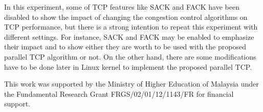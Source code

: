 \documentclass[a4paper, conference]{IEEEtran}
\begin{document}
In this experiment, some of TCP features like SACK and FACK have been disabled to show the impact of changing the congestion control algorithms on TCP performance, but there is a strong intention to repeat this experiment with different settings. For instance, SACK and FACK may be enabled to emphasize their impact and to show either they are worth to be used with the proposed parallel TCP algorithm or not. On the other hand, there are some modifications have to be done later in Linux kernel to implement the proposed parallel TCP.

This work was supported by the Ministry of Higher Education of Malaysia under the Fundamental Research Grant FRGS/02/01/12/1143/FR for financial support.

\begingroup
\let\itshape\upshape
\end{document}
